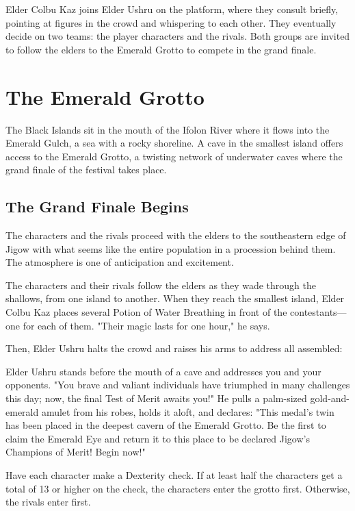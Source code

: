 \documentclass[10pt,a4paper,twoside,bg=print,twocolumn,openany,nodeprecatedcode]{dndbook}
\begin{document}
Elder Colbu Kaz joins Elder Ushru on the platform, where they consult briefly, pointing at figures in the crowd and whispering to each other. They eventually decide on two teams: the player characters and the rivals. Both groups are invited to follow the elders to the Emerald Grotto to compete in the grand finale.

\section{The Emerald Grotto}
The Black Islands sit in the mouth of the Ifolon River where it flows into the Emerald Gulch, a sea with a rocky shoreline. A cave in the smallest island offers access to the Emerald Grotto, a twisting network of underwater caves where the grand finale of the festival takes place.

\subsection{The Grand Finale Begins}
The characters and the rivals proceed with the elders to the southeastern edge of Jigow with what seems like the entire population in a procession behind them. The atmosphere is one of anticipation and excitement.

The characters and their rivals follow the elders as they wade through the shallows, from one island to another. When they reach the smallest island, Elder Colbu Kaz places several Potion of Water Breathing in front of the contestants—one for each of them. "Their magic lasts for one hour," he says.

Then, Elder Ushru halts the crowd and raises his arms to address all assembled:

\begin{DndReadAloud}{}
Elder Ushru stands before the mouth of a cave and addresses you and your opponents. "You brave and valiant individuals have triumphed in many challenges this day; now, the final Test of Merit awaits you!" He pulls a palm-sized gold-and-emerald amulet from his robes, holds it aloft, and declares: "This medal's twin has been placed in the deepest cavern of the Emerald Grotto. Be the first to claim the Emerald Eye and return it to this place to be declared Jigow's Champions of Merit! Begin now!"

\end{DndReadAloud}

Have each character make a Dexterity check. If at least half the characters get a total of 13 or higher on the check, the characters enter the grotto first. Otherwise, the rivals enter first.
\end{document}
